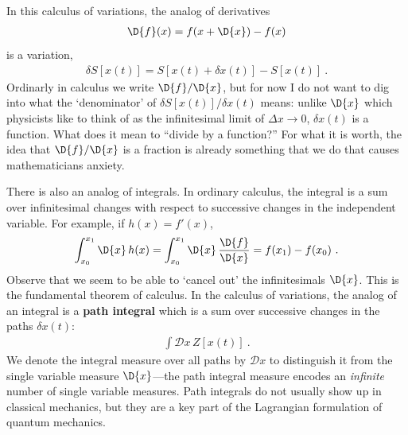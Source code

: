 In this calculus of variations, the analog of derivatives 
\begin{align}
    \D{f}(x) = f(x+\D{x}) - f(x) 
\end{align}
is a variation,
\begin{align}
    \delta S[x(t)] = 
     S[x(t)+\delta x(t)] - S[x(t)] 
     \ .
\end{align}
Ordinarly in calculus we write $\D{f}/\D{x}$, but for now I do not want to dig into what the `denominator' of $\delta S[x(t)]/\delta x(t)$ means: unlike $\D{x}$ which physicists like to think of as the infinitesimal limit of $\Delta x \to 0$, $\delta x(t)$ is a function. What does it mean to ``divide by a function?'' For what it is worth, the idea that $\D{f}/\D{x}$ is a fraction is already something that we do that causes mathematicians anxiety.

There is also an analog of integrals. In ordinary calculus, the integral is a sum over infinitesimal changes with respect to successive changes in the independent variable. For example, if $h(x) = f'(x)$,
\begin{align}
    \int_{x_0}^{x_1} \D{x} \, h(x)
    =
    \int_{x_0}^{x_1} \D{x} \, \frac{ \D{f} }{ \D{x} } 
    = f(x_1) - f(x_0)
    \ .
\end{align}
Observe that we seem to be able to `cancel out' the infinitesimals $\D{x}$. This is the fundamental theorem of calculus. In the calculus of variations, the analog of an integral is a \textbf{path integral} which is a sum over successive changes in the paths $\delta x(t)$:
\begin{align}
    \int \mathcal{D}x\, Z[x(t)] \ .
\end{align}
We denote the integral measure over all paths by $\mathcal{D}x$ to distinguish it from the single variable measure $\D{x}$---the path integral measure encodes an \emph{infinite} number of single variable measures. Path integrals do not usually show up in classical mechanics, but they are a key part of the Lagrangian formulation of quantum mechanics.

